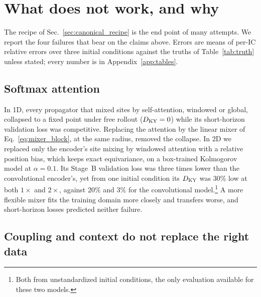 \section{What does not work, and why}
\label{sec:failure}

The recipe of Sec.~\ref{sec:canonical_recipe} is the end point of many
attempts. We report the four failures that bear on the claims above.
Errors are means of per-IC relative errors over three initial conditions
against the truths of Table~\ref{tab:truth} unless stated; every number
is in Appendix~\ref{app:tables}.

\subsection{Softmax attention}
\label{sec:fail_attention}

In 1D, every propagator that mixed sites by self-attention, windowed or
global, collapsed to a fixed point under free rollout ($D_{\mathrm{KY}}=0$) while its
short-horizon validation loss was competitive. Replacing the attention
by the linear mixer of Eq.~\eqref{eq:mixer_block}, at the same radius,
removed the collapse. In 2D we replaced only the encoder's site mixing by
windowed attention with a relative position bias, which keeps exact
equivariance, on a box-trained Kolmogorov model at $\alpha=0.1$. Its
Stage~B validation loss was three times lower than the convolutional
encoder's, yet from one initial condition its $D_{\mathrm{KY}}$ was $30\%$ low at both
$1\times$ and $2\times$, against $20\%$ and $3\%$ for the convolutional
model.\footnote{Both from unstandardized initial conditions, the only
evaluation available for these two models.} A more flexible mixer fits
the training domain more closely and transfers worse, and short-horizon
losses predicted neither failure.

\subsection{Coupling and context do not replace the right data}
\label{sec:fail_coupling}


